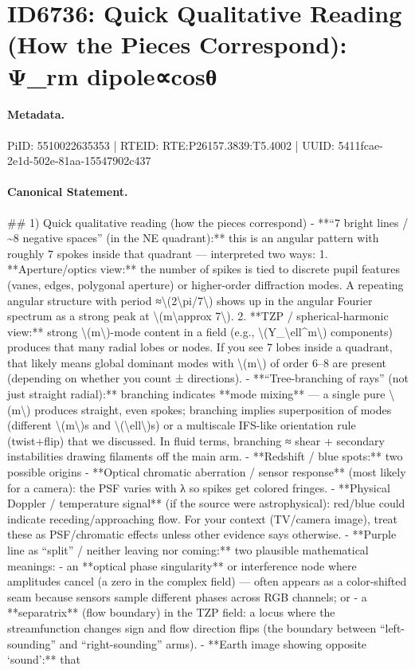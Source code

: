 \section*{ID6736: Quick Qualitative Reading (How the Pieces Correspond): Ψ\_rm dipole∝cosθ}
\paragraph{Metadata.}
PiID: 5510022635353 | RTEID: RTE:P26157.3839:T5.4002 | UUID: 5411fcae-2e1d-502e-81aa-15547902c437

\paragraph{Canonical Statement.}
\#\# 1) Quick qualitative reading (how the pieces correspond) - **“7 bright lines / \textasciitilde{}8 negative spaces” (in the NE quadrant):** this is an angular pattern with roughly 7 spokes inside that quadrant — interpreted two ways: 1. **Aperture/optics view:** the number of spikes is tied to discrete pupil features (vanes, edges, polygonal aperture) or higher-order diffraction modes. A repeating angular structure with period ≈\textbackslash{}(2\textbackslash{}pi/7\textbackslash{}) shows up in the angular Fourier spectrum as a strong peak at \textbackslash{}(m\textbackslash{}approx 7\textbackslash{}). 2. **TZP / spherical-harmonic view:** strong \textbackslash{}(m\textbackslash{})-mode content in a field (e.g., \textbackslash{}(Y\_\textbackslash{}ell\textasciicircum{}m\textbackslash{}) components) produces that many radial lobes or nodes. If you see 7 lobes inside a quadrant, that likely means global dominant modes with \textbackslash{}(m\textbackslash{}) of order 6–8 are present (depending on whether you count ± directions). - **“Tree-branching of rays” (not just straight radial):** branching indicates **mode mixing** — a single pure \textbackslash{}(m\textbackslash{}) produces straight, even spokes; branching implies superposition of modes (different \textbackslash{}(m\textbackslash{})s and \textbackslash{}(\textbackslash{}ell\textbackslash{})s) or a multiscale IFS-like orientation rule (twist+flip) that we discussed. In fluid terms, branching ≈ shear + secondary instabilities drawing filaments off the main arm. - **Redshift / blue spots:** two possible origins - **Optical chromatic aberration / sensor response** (most likely for a camera): the PSF varies with λ so spikes get colored fringes. - **Physical Doppler / temperature signal** (if the source were astrophysical): red/blue could indicate receding/approaching flow. For your context (TV/camera image), treat these as PSF/chromatic effects unless other evidence says otherwise. - **Purple line as “split” / neither leaving nor coming:** two plausible mathematical meanings: - an **optical phase singularity** or interference node where amplitudes cancel (a zero in the complex field) — often appears as a color-shifted seam because sensors sample different phases across RGB channels; or - a **separatrix** (flow boundary) in the TZP field: a locus where the streamfunction changes sign and flow direction flips (the boundary between “left-sounding” and “right-sounding” arms). - **Earth image showing opposite ‘sound’:** that 